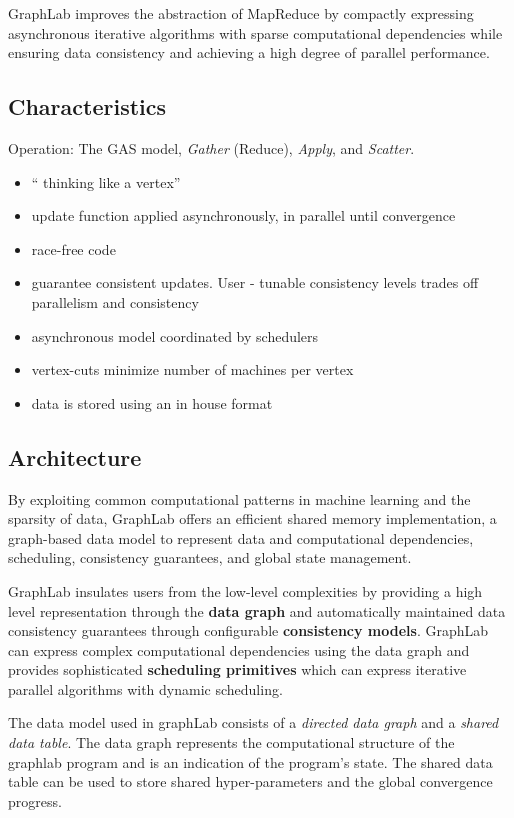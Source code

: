 \documentclass[letterpaper,twocolumn,10pt]{article}
\begin{document}
GraphLab improves the abstraction of MapReduce by compactly expressing asynchronous iterative algorithms with sparse computational dependencies while ensuring data consistency and achieving a high degree of parallel performance.
\subsection{Characteristics}
Operation: The GAS model, \textit{Gather} (Reduce), \textit{Apply}, and \textit{Scatter}.
\begin{itemize}
\item `` thinking like a vertex''
\item update function applied asynchronously, in parallel until convergence
\item race-free code
\item guarantee consistent updates. User - tunable consistency levels trades off parallelism and consistency
\item asynchronous model coordinated by schedulers
\item vertex-cuts minimize number of machines per vertex
\item data is stored using an in house format
\end{itemize}
\subsection{Architecture}
By exploiting common computational patterns in machine learning and the sparsity of data, GraphLab offers an efficient shared memory implementation, a graph-based data model to represent data and computational dependencies, scheduling, consistency guarantees, and global state management.

GraphLab insulates users from the low-level complexities by providing a high level representation through the \textbf{data graph} and automatically maintained data consistency guarantees through configurable \textbf{consistency models}. GraphLab can express complex computational dependencies using the data graph and provides sophisticated \textbf{scheduling primitives} which can express iterative parallel algorithms with dynamic scheduling.

The data model used in graphLab consists of a \textit{directed data graph} and a \textit{shared data table}. The data graph represents the computational structure of the graphlab program and is an indication of the program's state. The shared data table can be used to store shared hyper-parameters and the global convergence progress.
\end{document}
